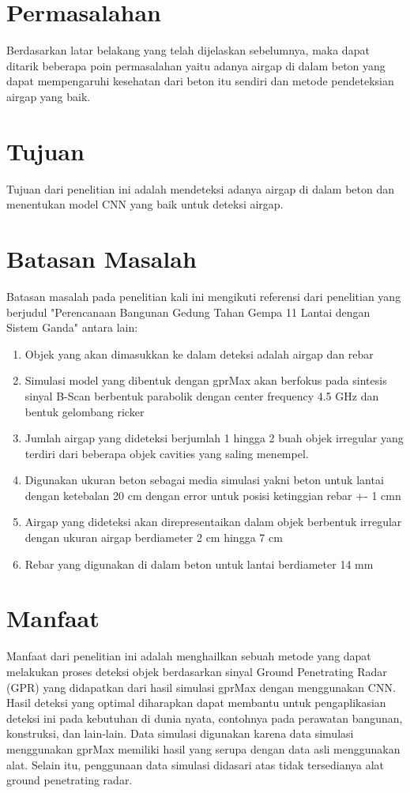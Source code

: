 \section{Permasalahan}
\label{sec:permasalahan}

Berdasarkan latar belakang yang telah dijelaskan sebelumnya, maka dapat ditarik beberapa poin permasalahan yaitu adanya airgap di dalam beton yang dapat mempengaruhi kesehatan dari beton itu sendiri dan metode pendeteksian airgap yang baik.

\section{Tujuan}
\label{sec:Tujuan}
Tujuan dari penelitian ini adalah mendeteksi adanya airgap di dalam beton dan menentukan model CNN yang baik untuk deteksi airgap.

\section{Batasan Masalah}
\label{sec:batasanmasalah}
Batasan masalah pada penelitian kali ini mengikuti referensi dari penelitian yang berjudul "Perencanaan Bangunan Gedung Tahan Gempa 11 Lantai dengan Sistem Ganda" \parencite{Jeply2021} antara lain:
\begin{enumerate}
    \item Objek yang akan dimasukkan ke dalam deteksi adalah airgap dan rebar
    \item Simulasi model yang dibentuk dengan gprMax akan berfokus pada sintesis sinyal B-Scan berbentuk parabolik dengan center frequency 4.5 GHz dan bentuk gelombang ricker
    \item Jumlah airgap yang dideteksi berjumlah 1 hingga 2 buah objek irregular yang terdiri dari beberapa objek cavities yang saling menempel.
    \item Digunakan ukuran beton sebagai media simulasi yakni beton untuk lantai dengan ketebalan 20 cm dengan error untuk posisi ketinggian rebar +- 1 cmn 
    \item Airgap yang dideteksi akan direpresentaikan dalam objek berbentuk irregular dengan ukuran airgap berdiameter 2 cm hingga 7 cm
    \item Rebar yang digunakan di dalam beton untuk lantai berdiameter 14 mm
\end{enumerate}

\section{Manfaat}
Manfaat dari penelitian ini adalah menghailkan sebuah metode yang dapat melakukan proses deteksi objek berdasarkan sinyal Ground Penetrating Radar (GPR) yang didapatkan dari hasil simulasi gprMax dengan menggunakan CNN. Hasil deteksi yang optimal diharapkan dapat membantu untuk pengaplikasian deteksi ini pada kebutuhan di dunia nyata, contohnya pada perawatan bangunan, konstruksi, dan lain-lain. Data simulasi digunakan karena data simulasi menggunakan gprMax memiliki hasil yang serupa dengan data asli menggunakan alat. Selain itu, penggunaan data simulasi didasari atas tidak tersedianya alat ground penetrating radar.